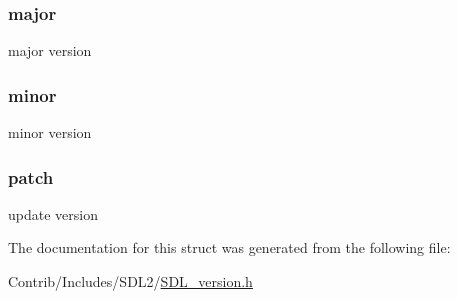 \subsubsection[{\texorpdfstring{major}{major}}]{ major}\hypertarget{struct_s_d_l__version_a302f1b7284c3bcdfa0dee1aa267b955e}{}\label{struct_s_d_l__version_a302f1b7284c3bcdfa0dee1aa267b955e}
major version 
\subsubsection[{\texorpdfstring{minor}{minor}}]{ minor}\hypertarget{struct_s_d_l__version_a8eb06ff08bc41ff4eed7c42fc8b40d50}{}\label{struct_s_d_l__version_a8eb06ff08bc41ff4eed7c42fc8b40d50}
minor version 
\subsubsection[{\texorpdfstring{patch}{patch}}]{ patch}\hypertarget{struct_s_d_l__version_af8399ce0bb7205f4761fa050d33ea71e}{}\label{struct_s_d_l__version_af8399ce0bb7205f4761fa050d33ea71e}
update version 

The documentation for this struct was generated from the following file\+:\begin{DoxyCompactItemize}
\item 
Contrib/\+Includes/\+S\+D\+L2/\hyperlink{_s_d_l__version_8h}{S\+D\+L\+\_\+version.\+h}\end{DoxyCompactItemize}
